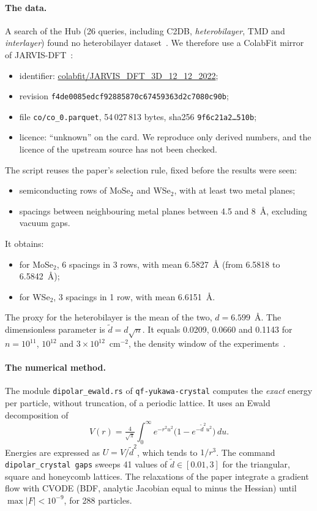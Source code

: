 \paragraph{The data.} A search of the Hub (26 queries, including C2DB, \emph{heterobilayer}, TMD and
\emph{interlayer}) found no heterobilayer dataset~\cite{ch2dip}. We therefore use a ColabFit
mirror of JARVIS-DFT~\cite{ch5:jarvis}:
\begin{itemize}
\item identifier: \url{colabfit/JARVIS_DFT_3D_12_12_2022};
\item revision \texttt{f4de0085edcf92885870c67459363d2c7080c90b};
\item file \texttt{co/co\_0.parquet}, 54\,027\,813 bytes, sha256 \texttt{9f6c21a2\dots 510b};
\item licence: ``unknown'' on the card. We reproduce only derived numbers, and the licence of the
upstream source has not been checked.
\end{itemize}
The script reuses the paper's selection rule, fixed before the results were seen:
\begin{itemize}
\item semiconducting rows of MoSe$_2$ and WSe$_2$, with at least two metal planes;
\item spacings between neighbouring metal planes between 4.5 and 8~\AA, excluding vacuum gaps.
\end{itemize}
It obtains:
\begin{itemize}
\item for MoSe$_2$, 6 spacings in 3 rows, with mean 6.5827~\AA{} (from 6.5818 to 6.5842~\AA);
\item for WSe$_2$, 3 spacings in 1 row, with mean 6.6151~\AA.
\end{itemize}
The proxy for the heterobilayer is the mean of the two, $d=6.599$~\AA. The dimensionless parameter is
$\tilde d=d\sqrt n$. It equals 0.0209, 0.0660 and 0.1143 for $n=10^{11}$, $10^{12}$ and
$3\times10^{12}$~cm$^{-2}$, the density window of the experiments~\cite{ch5:wang}.

\paragraph{The numerical method.} The module \texttt{dipolar\_ewald.rs} of \texttt{qf-yukawa-crystal} computes
the \emph{exact} energy per particle, without truncation, of a periodic lattice. It uses an Ewald
decomposition of
\[V(r)=\tfrac{4}{\sqrt\pi}\int_0^\infty e^{-r^2u^2}\bigl(1-e^{-\tilde d^2u^2}\bigr)\,du .\]
Energies are expressed as $U=V/\tilde d^2$, which tends to $1/r^3$. The command \texttt{dipolar\_crystal gaps}
sweeps 41 values of $\tilde d\in[0.01, 3]$ for the triangular, square and honeycomb lattices. The
relaxations of the paper integrate a gradient flow with CVODE (BDF, analytic Jacobian equal to minus the
Hessian) until $\max|F|<10^{-9}$, for 288 particles.

